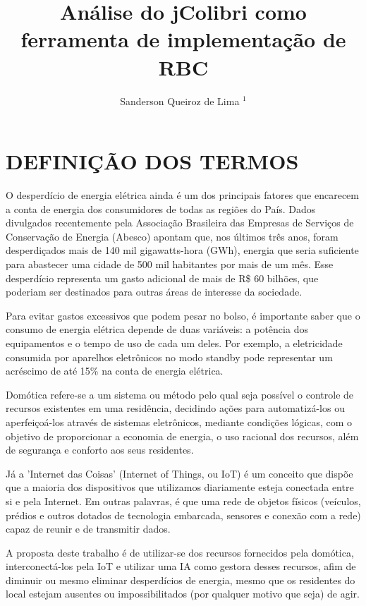 \documentclass[10pt,brazil,english]{article}
\title{Análise do jColibri como ferramenta de implementação de RBC}
\author{Sanderson Queiroz de Lima $^{1}$}
\begin{document}
\pagestyle{fancy} %

\maketitle
\newpage


\section{\uppercase{Definição dos termos}}
O desperdício de energia elétrica ainda é um dos principais fatores que encarecem a conta de energia dos consumidores de todas as regiões do País. Dados divulgados recentemente pela Associação Brasileira das Empresas de Serviços de  Conservação de Energia (Abesco) apontam que, nos últimos três anos, foram desperdiçados mais de 140 mil gigawatts-hora (GWh), energia que seria suficiente para abastecer uma cidade de 500 mil  habitantes por mais de um mês. Esse desperdício representa um gasto adicional de mais de R\$ 60 bilhões, que poderiam ser destinados para outras áreas de interesse da sociedade. 

Para evitar gastos excessivos que podem pesar no bolso, é importante saber que o consumo de energia elétrica depende de duas variáveis: a potência dos equipamentos e o tempo de uso de cada um deles. Por exemplo, a eletricidade consumida por aparelhos eletrônicos no modo standby pode representar um acréscimo de até 15\% na conta de energia elétrica.

Domótica refere-se a um sistema ou método pelo qual seja possível o controle de recursos existentes em uma residência, decidindo ações para automatizá-los ou aperfeiçoá-los através de sistemas eletrônicos,  mediante condições lógicas, com o objetivo de proporcionar a economia de energia, o uso racional dos recursos, além de segurança e conforto aos seus residentes.

Já a 'Internet das Coisas' (Internet of Things, ou IoT) é um conceito que dispõe que a maioria dos dispositivos que utilizamos diariamente esteja conectada entre si e pela Internet. Em outras palavras, é que uma rede de objetos físicos (veículos, prédios e outros dotados de tecnologia embarcada, sensores e conexão com a rede) capaz de reunir e de transmitir dados.

A proposta deste trabalho é de utilizar-se dos recursos fornecidos pela domótica, interconectá-los pela IoT e utilizar uma IA como gestora desses recursos, afim de diminuir ou mesmo eliminar desperdícios de energia, mesmo que os residentes do local estejam ausentes ou impossibilitados (por qualquer motivo que seja) de agir.
\end{document}
